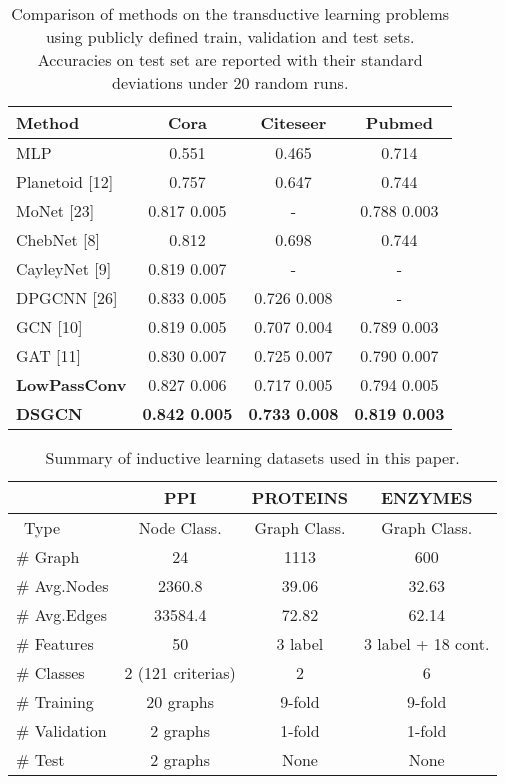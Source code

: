 \documentclass{article}
\begin{document}
\begin{table}[!t]
\renewcommand{\arraystretch}{1.3}
\caption{Comparison of methods on the transductive learning problems  using publicly defined train, validation and test sets. Accuracies on test set are reported with their standard deviations under 20 random runs.}

\centering
\begin{tabular}{l c c c }

 Method &  Cora & Citeseer & Pubmed \\
\toprule

MLP &0.551     &0.465   & 0.714  \\
Planetoid [12]
&0.757    &0.647    & 0.744  \\
MoNet [23]  &0.817  0.005   &-  & 0.788  0.003  \\
ChebNet [8]  &0.812    &0.698   & 0.744  \\
CayleyNet [9] &0.819  0.007   &-   & -  \\
DPGCNN [26] &0.833  0.005 & 0.726  0.008  &- \\
GCN [10]  &0.819  0.005    &0.707  0.004    & 0.789     0.003    \\
GAT [11]  &0.830  0.007   &0.725  0.007  & 0.790  0.007   \\

\midrule
\textbf{LowPassConv} &0.827    0.006	& 0.717     0.005 &0.794   0.005 \\

\textbf{DSGCN} &  \textbf{0.842    0.005}	& \textbf{0.733    0.008}	& \textbf{0.819   0.003}	 \\
\bottomrule

\end{tabular}
\label{tab:trans-first}

\end{table}



\begin{table}[!t]
\renewcommand{\arraystretch}{1.3}
\caption{Summary of inductive learning datasets used in this paper.}
\centering

\begin{tabular}{l c c c}
\toprule
  & PPI & PROTEINS & ENZYMES\\
\midrule
\ Type & Node Class. & Graph Class. & Graph Class. \\
\# Graph  &24  &1113  &600  \\
\# Avg.Nodes  &2360.8  &39.06  &32.63 \\
\# Avg.Edges &33584.4 &72.82 & 62.14 \\
\# Features &50 &3 label & 3 label + 18 cont. \\
\# Classes &2 (121 criterias) &2   &6  \\
\# Training &20 graphs & 9-fold & 9-fold  \\
\# Validation &2 graphs & 1-fold   & 1-fold  \\
\# Test &2 graphs &  None & None  \\
\bottomrule
\end{tabular}
\label{tableindsum}
\end{table}
\end{document}
